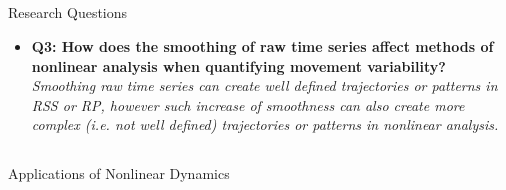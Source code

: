 \subsection{}
{

\begin{frame}{Research Questions}

\begin{itemize}
	\item \textbf{ 
 	Q3: How does the smoothing of raw time series affect 
	methods of nonlinear analysis
	when quantifying movement variability?
} \\
	\textit{
Smoothing raw time series can create well defined trajectories
or patterns in RSS or RP, however such increase of smoothness 
can also create more complex (i.e. not well defined) trajectories
or patterns in nonlinear analysis. 
}

\end{itemize}

\end{frame}
}










\subsection{}
{

\begin{frame}{Applications of Nonlinear Dynamics}
    \begin{figure}
	
   \end{figure}
	
\end{frame}
}






